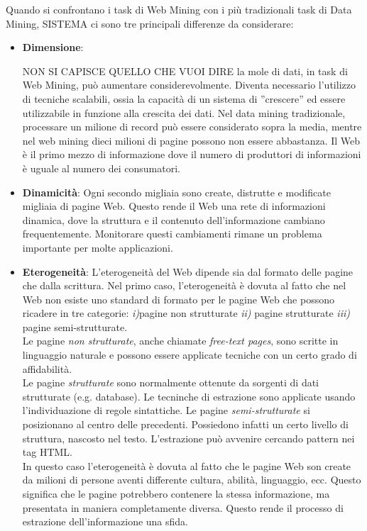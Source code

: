 Quando si confrontano i task di Web Mining con i più tradizionali task di Data Mining,
\color{red}
SISTEMA
 ci sono tre principali differenze da considerare:
\begin{itemize}
\item \textbf{Dimensione}: 

NON SI CAPISCE QUELLO CHE VUOI DIRE
la mole di dati, in task di Web Mining, può aumentare considerevolmente. Diventa necessario l'utilizzo di tecniche scalabili, ossia la capacità di un sistema di ''crescere'' ed essere utilizzabile in funzione alla crescita dei dati. Nel data mining tradizionale, processare un milione di record può essere considerato sopra la media, mentre nel web mining dieci milioni di pagine possono non essere abbastanza. Il Web è il primo mezzo di informazione dove il numero di produttori di informazioni è uguale al numero dei consumatori.

\item \textbf{Dinamicità}: 
Ogni secondo migliaia sono create, distrutte e modificate migliaia di pagine Web. Questo rende il Web una rete di informazioni dinamica, dove la struttura e il contenuto dell'informazione cambiano frequentemente. Monitorare questi cambiamenti rimane un problema importante per molte applicazioni.

\item \textbf{Eterogeneità}:
L'eterogeneità del Web dipende sia dal formato delle pagine che dalla scrittura. Nel primo caso, l'eterogeneità è dovuta al fatto che nel Web non esiste uno standard di formato per le pagine Web che possono ricadere in tre categorie: \textit{i)}pagine non strutturate \textit{ii)} pagine strutturate \textit{iii)} pagine semi-strutturate.
\\
Le pagine \textit{non strutturate}, anche chiamate \textit{free-text pages}, sono scritte in linguaggio naturale e possono essere applicate tecniche con un certo grado di affidabilità.
\\
Le pagine \textit{strutturate} sono normalmente ottenute da sorgenti di dati strutturate (e.g. database). Le tecninche di estrazione sono applicate usando l'individuazione di regole sintattiche.
Le pagine \textit{semi-strutturate} si posizionano al centro delle precedenti. Possiedono infatti un certo livello di struttura, nascosto nel testo. L'estrazione può avvenire cercando pattern nei tag HTML.
\\
In questo caso l'eterogeneità è dovuta al fatto che le pagine Web son create da milioni di persone aventi differente cultura, abilità, linguaggio, ecc. Questo significa che le pagine potrebbero contenere la stessa informazione, ma presentata in maniera completamente diversa. Questo rende il processo di estrazione dell'informazione una sfida.


\end{itemize}
